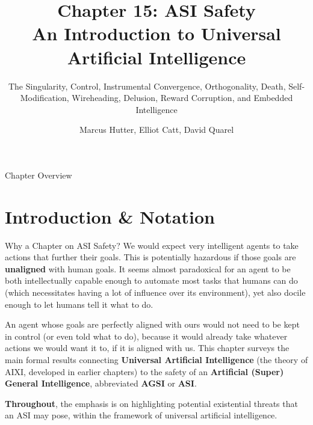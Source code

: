 \documentclass[aspectratio=169,10pt]{beamer}
\title[Ch.\,15 ASI Safety]{%
  \textbf{Chapter 15: ASI Safety}\\
  \normalsize An Introduction to Universal Artificial Intelligence}
\subtitle{The Singularity, Control, Instrumental Convergence, Orthogonality, Death, Self-Modification, Wireheading, Delusion, Reward Corruption, and Embedded Intelligence}
\author{Marcus Hutter, Elliot Catt, David Quarel}
\institute{Taylor \& Francis / CRC Press, 2024}
\date{}
\begin{document}
\begin{frame}
  \titlepage
\end{frame}

\begin{frame}{Chapter Overview}
  \tableofcontents
\end{frame}


\section{Introduction \& Notation}

\begin{frame}{Why a Chapter on ASI Safety?}
  We would expect very intelligent agents to take actions that further
  their goals. This is potentially hazardous if those goals are
  \textbf{unaligned} with human goals. It seems almost paradoxical for an
  agent to be both intellectually capable enough to automate most tasks
  that humans can do (which necessitates having a lot of influence over
  its environment), yet also docile enough to let humans tell it what to
  do.

  \vspace{0.4em}
  An agent whose goals are perfectly aligned with ours would not need to
  be kept in control (or even told what to do), because it would already
  take whatever actions we would want it to, if it is aligned with us.
  This chapter surveys the main formal results connecting \textbf{Universal
  Artificial Intelligence} (the theory of AIXI, developed in earlier
  chapters) to the safety of an \textbf{Artificial (Super) General
  Intelligence}, abbreviated \textbf{AGSI} or \textbf{ASI}.

  \vspace{0.4em}
  \textbf{Throughout}, the emphasis is on highlighting potential
  existential threats that an ASI may pose, within the framework of
  universal artificial intelligence.
\end{frame}
\end{document}
